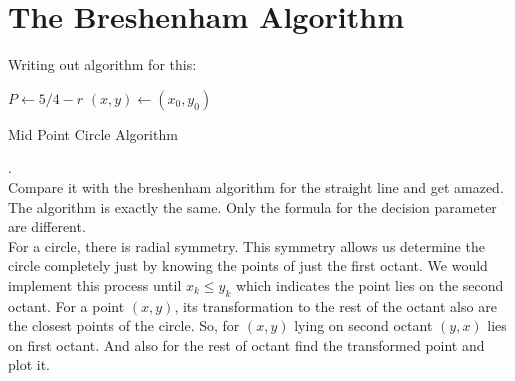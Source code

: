 \documentclass[a4paper,12pt,oneside]{book}
\begin{document}
 \section{The Breshenham Algorithm}
Writing out algorithm for this:

\begin{algorithm}[H]
		
	\SetAlgoLined
	$P\gets 5/4-r$\;
	$(x,y) \gets (x_0,y_0)$\;
	\caption{Mid Point Circle Algorithm}
\end{algorithm}

.\\[.2cm]

Compare it with the breshenham algorithm for the straight line and get amazed. The algorithm is exactly the same. Only the formula for the decision parameter are different.\\

  For a circle, there is radial symmetry. This symmetry allows us determine the circle completely just by knowing the points of just the first octant. We would implement this process until $x_k\leq y_k$ which indicates the point lies on the second octant. For a point $(x,y)$, its transformation to the rest of the octant also are the closest points of the circle. So, for $(x,y)$ lying on second octant $(y,x)$ lies on  first octant. And also for the rest of octant find the transformed point and plot it.
\end{document}
